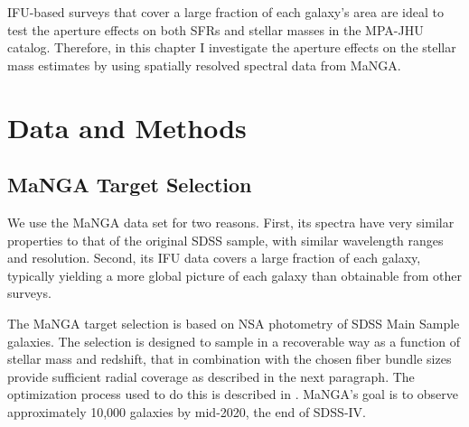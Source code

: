 
IFU-based surveys that cover a large fraction of each
galaxy's area are ideal to test the aperture 
effects on both SFRs and stellar masses in the MPA-JHU 
catalog. Therefore, in this chapter I investigate the aperture 
effects on the stellar mass estimates by using spatially 
resolved spectral data from MaNGA.\\


\section{Data and Methods}

\subsection{MaNGA Target Selection}
\label{mangadrp}

We use the MaNGA data set for two reasons. First,
its spectra have very similar properties to that of 
the original SDSS sample, with similar wavelength 
ranges and resolution. Second, its IFU data covers 
a large fraction of each galaxy, typically yielding 
a more global picture of each galaxy than obtainable
from other surveys. 

The MaNGA target selection is based on NSA photometry of 
SDSS Main Sample galaxies. The selection is designed to 
sample in a recoverable way as a function of stellar mass
and redshift, that in combination with the chosen fiber 
bundle sizes provide sufficient radial coverage as 
described  in the next paragraph.
The optimization process used to do this is described 
in \citet{2017AJ....154...86W}. MaNGA's goal is to 
observe approximately 10,000 galaxies by mid-2020,
the end of SDSS-IV.


